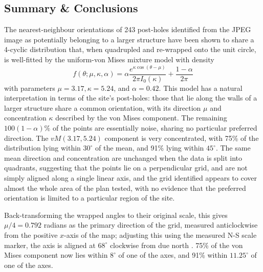 \documentclass[../../ArchStats.tex]{subfiles}
\begin{document}



\subsection{Summary \& Conclusions}


The nearest-neighbour orientations of 243 post-holes identified from the JPEG image as potentially belonging to a larger structure have been shown to share a 4-cyclic distribution that, when quadrupled and re-wrapped onto the unit circle, is well-fitted by the uniform-von Mises mixture model with density
\begin{equation}
f(\theta; \mu, \kappa, \alpha) = \alpha \frac{e^{\kappa \cos(\theta - \mu)}}{2\pi I_0(\kappa)} + \frac{1-\alpha}{2\pi}
\end{equation}
with parameters $\mu = 3.17, \kappa = 5.24$, and $\alpha =  0.42$. This model has a natural interpretation in terms of the site's post-holes: those that lie along the walls of a larger structure share a common orientation, with its direction $\mu$ and concentration $\kappa$ described by the von Mises component. The remaining $100(1-\alpha)\%$ of the points are essentially noise, sharing no particular preferred direction. The $vM(3.17, 5.24)$ component is very concentrated, with 75\% of the distribution lying within $30^\circ$ of the mean, and 91\% lying within $45^\circ$. The same mean direction and  concentration are unchanged when the data is split into quadrants, suggesting that the points lie on a perpendicular grid, and are not simply aligned along a single linear axis, and the grid identified appears to cover almost the whole area of the plan tested, with no evidence that the preferred orientation is limited to a particular region of the site.

Back-transforming the wrapped angles to their original scale, this gives $\mu/4 = 0.792$ radians as the primary direction of the grid, measured anticlockwise from the positive $x$-axis of the map; adjusting this using the measured N-S scale marker, the axis is aligned at $68^\circ$ clockwise from due north . 75\% of the von Mises component now lies within $8^\circ$ of one of the axes, and 91\% within $11.25^\circ$ of one of the axes.


\end{document}
